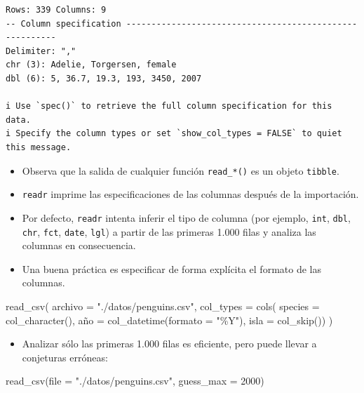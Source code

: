 \documentclass[
  letterpaper,
  DIV=11,
  numbers=noendperiod]{scrreprt}
\newenvironment{Shaded}{\begin{snugshade}}{\end{snugshade}}
\newcommand{\AttributeTok}[1]{\textcolor[rgb]{0.40,0.45,0.13}{#1}}
\newcommand{\DecValTok}[1]{\textcolor[rgb]{0.68,0.00,0.00}{#1}}
\newcommand{\FunctionTok}[1]{\textcolor[rgb]{0.28,0.35,0.67}{#1}}
\newcommand{\NormalTok}[1]{\textcolor[rgb]{0.00,0.23,0.31}{#1}}
\newcommand{\OtherTok}[1]{\textcolor[rgb]{0.00,0.23,0.31}{#1}}
\newcommand{\StringTok}[1]{\textcolor[rgb]{0.13,0.47,0.30}{#1}}
\providecommand{\tightlist}{%
  \setlength{\itemsep}{0pt}\setlength{\parskip}{0pt}}\usepackage{longtable,booktabs,array}
\begin{document}
\begin{verbatim}
Rows: 339 Columns: 9
-- Column specification --------------------------------------------------------
Delimiter: ","
chr (3): Adelie, Torgersen, female
dbl (6): 5, 36.7, 19.3, 193, 3450, 2007

i Use `spec()` to retrieve the full column specification for this data.
i Specify the column types or set `show_col_types = FALSE` to quiet this message.
\end{verbatim}

\begin{itemize}
\item
  Observa que la salida de cualquier función \texttt{read\_*()} es un
  objeto \texttt{tibble}.
\item
  \texttt{readr} imprime las especificaciones de las columnas después de
  la importación.
\item
  Por defecto, \texttt{readr} intenta inferir el tipo de columna (por
  ejemplo, \texttt{int}, \texttt{dbl}, \texttt{chr}, \texttt{fct},
  \texttt{date}, \texttt{lgl}) a partir de las primeras 1.000 filas y
  analiza las columnas en consecuencia.
\item
  Una buena práctica es especificar de forma explícita el formato de las
  columnas.
\end{itemize}

\begin{Shaded}
\begin{Highlighting}[]
\FunctionTok{read\_csv}\NormalTok{(}
  \AttributeTok{archivo =} \StringTok{"./datos/penguins.csv"}\NormalTok{,}
  \AttributeTok{col\_types =} \FunctionTok{cols}\NormalTok{(}
    \AttributeTok{species =} \FunctionTok{col\_character}\NormalTok{(),}
\NormalTok{    año }\OtherTok{=} \FunctionTok{col\_datetime}\NormalTok{(}\AttributeTok{formato =} \StringTok{"\%Y"}\NormalTok{),}
    \AttributeTok{isla =} \FunctionTok{col\_skip}\NormalTok{())}
\NormalTok{  )}
\end{Highlighting}
\end{Shaded}

\begin{itemize}
\tightlist
\item
  Analizar sólo las primeras 1.000 filas es eficiente, pero puede llevar
  a conjeturas erróneas:
\end{itemize}

\begin{Shaded}
\begin{Highlighting}[]
\FunctionTok{read\_csv}\NormalTok{(}\AttributeTok{file =} \StringTok{"./datos/penguins.csv"}\NormalTok{, }\AttributeTok{guess\_max =} \DecValTok{2000}\NormalTok{)}
\end{Highlighting}
\end{Shaded}
\end{document}
